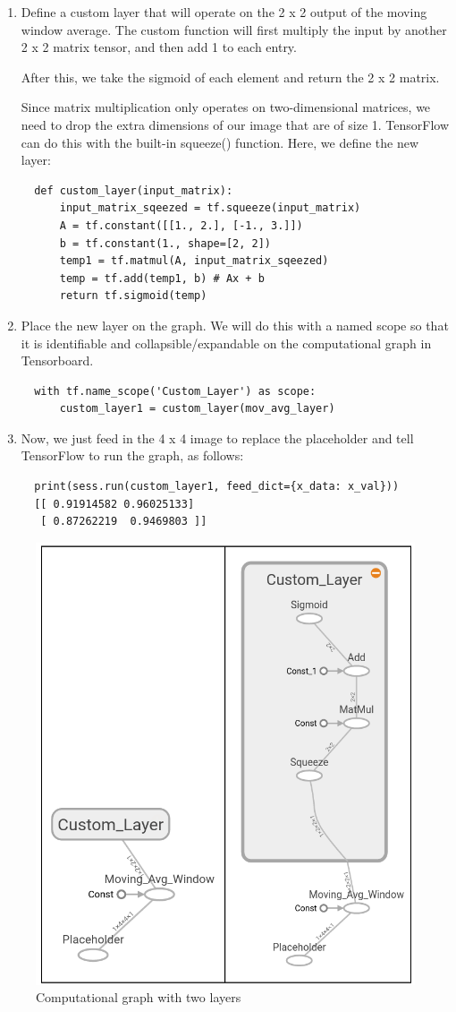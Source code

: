\documentclass{article}
\begin{document}
\begin{enumerate}
  \item Define a custom layer that will operate on the 2 x 2 output of the moving window average. The custom function will first multiply the input by another 2 x 2 matrix tensor, and then add 1 to each entry.

  After this, we take the sigmoid of each element and return the 2 x 2 matrix.

  Since matrix multiplication only operates on two-dimensional matrices, we need to drop the extra dimensions of our image that are of size 1. TensorFlow can do this with the built-in squeeze() function. Here, we define the new layer:
  \begin{lstlisting}
  def custom_layer(input_matrix):
      input_matrix_sqeezed = tf.squeeze(input_matrix)
      A = tf.constant([[1., 2.], [-1., 3.]])
      b = tf.constant(1., shape=[2, 2])
      temp1 = tf.matmul(A, input_matrix_sqeezed)
      temp = tf.add(temp1, b) # Ax + b
      return tf.sigmoid(temp)
  \end{lstlisting}

  \item Place the new layer on the graph. We will do this with a named scope so that it is identifiable and collapsible/expandable on the computational graph in Tensorboard.
  \begin{lstlisting}
  with tf.name_scope('Custom_Layer') as scope:
      custom_layer1 = custom_layer(mov_avg_layer)
  \end{lstlisting}

  \item Now, we just feed in the 4 x 4 image to replace the placeholder and tell TensorFlow to run the graph, as follows:
  \begin{lstlisting}
  print(sess.run(custom_layer1, feed_dict={x_data: x_val}))
  [[ 0.91914582 0.96025133]
   [ 0.87262219  0.9469803 ]]
  \end{lstlisting}

\end{enumerate}

\begin{figure}[H]
  \centering
  \includegraphics[width=0.8 \linewidth]{images/03_Multiple_Layers.png}
  \caption{Computational graph with two layers}
\end{figure}
\end{document}
